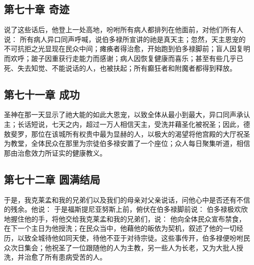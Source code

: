 
\subsection{第七十章 奇迹}

说了这些话后，他登上一处高地，吩咐所有病人都排列在他面前，对他们所有人说： 所有病人异口同声呼喊，说伯多禄所宣讲的祂是真天主；忽然，天主恩宠的不可抗拒之光显现在民众中间；瘫痪者得治愈，开始跑到伯多禄脚前；盲人因复明而欢呼；跛子因重获行走能力而感谢；病人因恢复健康而喜乐；甚至有些几乎已死、失去知觉、不能说话的人，也被扶起；所有癫狂者和附魔者都得到释放。\par


\subsection{第七十一章 成功}

圣神在那一天显示了祂大能的如此大恩宠，以致全体从最小到最大，异口同声承认主；长话短说，七天之内，超过一万人相信天主，受洗并藉圣化被祝圣；因此，德敖斐罗，那位在该城所有权贵中最为显赫的人，以极大的渴望将他宫殿的大厅祝圣为教堂，全体民众在那里为宗徒伯多禄安置了一个座位；众人每日聚集听道，相信那由治愈效力所证实的健康教义。\par


\subsection{第七十二章 圆满结局}

于是，我克莱孟和我的兄弟们以及我们的母亲对父亲说话，问他心中是否还有不信的残余。他说： 于是福斯提尼亚努斯上前，俯伏在伯多禄脚前说： 伯多禄极欢欣地握住他的手，将他交给我克莱孟和我的兄弟们，说： 他向全体民众宣布禁食，在下一个主日为他授洗；在民众当中，他藉他的皈依为契机，叙述了他的一切经历，以致全城待他如同天使，待他不亚于对待宗徒。这些事传开，伯多禄便吩咐民众次日集会；他祝圣了一位跟随他的人为主教，另一些人为长老，又为大批人授洗，并治愈了所有患病受苦的人。\par

